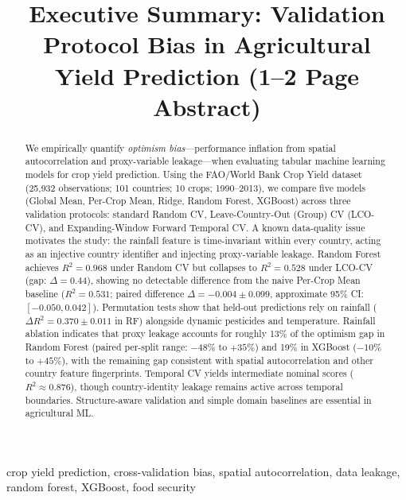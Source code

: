 \documentclass[conference]{IEEEtran}
\begin{document}
\title{Executive Summary: Validation Protocol Bias in Agricultural\\
Yield Prediction (1--2 Page Abstract)}

\author{
}

\maketitle

\begin{abstract}
We empirically quantify \emph{optimism bias}---performance inflation from 
spatial autocorrelation and proxy-variable leakage---when evaluating tabular 
machine learning models for crop yield prediction. Using the FAO/World Bank 
Crop Yield dataset (25{,}932 observations; 101 countries; 10 crops; 1990--2013), 
we compare five models (Global Mean, Per-Crop Mean, Ridge, Random Forest, XGBoost) 
across three validation protocols: standard Random CV, 
Leave-Country-Out (Group) CV (LCO-CV), and Expanding-Window Forward Temporal CV. 
A known data-quality issue motivates the study: the rainfall feature 
is time-invariant within every country, acting as an injective country identifier 
and injecting proxy-variable leakage. Random Forest achieves $R^2 = 0.968$ 
under Random CV but collapses to $R^2 = 0.528$ under LCO-CV (gap: $\Delta = 0.44$), 
showing no detectable difference from the naive Per-Crop Mean baseline ($R^2 = 0.531$; 
paired difference $\Delta = -0.004 \pm 0.099$, approximate 95\% CI: $[-0.050, 0.042]$). 
Permutation tests show that held-out predictions rely on rainfall 
($\Delta R^2 = 0.370 \pm 0.011$ in RF) alongside dynamic pesticides and temperature. 
Rainfall ablation indicates that proxy leakage accounts for roughly 13\% of the optimism 
gap in Random Forest (paired per-split range: $-48\%$ to $+35\%$) and 19\% in XGBoost 
($-10\%$ to $+45\%$), with the remaining gap consistent with spatial autocorrelation 
and other country feature fingerprints. Temporal CV yields intermediate nominal scores 
($R^2 \approx 0.876$), though country-identity leakage remains active across temporal 
boundaries. Structure-aware validation and simple domain baselines are essential in 
agricultural ML.
\end{abstract}

\begin{IEEEkeywords}
crop yield prediction, cross-validation bias, spatial autocorrelation, 
data leakage, random forest, XGBoost, food security
\end{IEEEkeywords}
\end{document}
